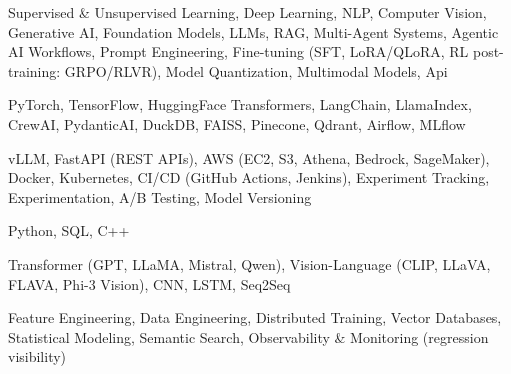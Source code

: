 \documentclass[letter,10pt]{article}
\begin{document}
 Supervised \& Unsupervised Learning, Deep Learning, NLP, Computer Vision, Generative AI, Foundation Models, LLMs, RAG, Multi-Agent Systems, Agentic AI Workflows, Prompt Engineering, Fine-tuning (SFT, LoRA/QLoRA, RL post-training: GRPO/RLVR), Model Quantization, Multimodal Models, Api\par\vspace{2pt}

 PyTorch, TensorFlow, HuggingFace Transformers, LangChain, LlamaIndex, CrewAI, PydanticAI, DuckDB, FAISS, Pinecone, Qdrant, Airflow, MLflow\par\vspace{2pt}

 vLLM, FastAPI (REST APIs), AWS (EC2, S3, Athena, Bedrock, SageMaker), Docker, Kubernetes, CI/CD (GitHub Actions, Jenkins), Experiment Tracking, Experimentation, A/B Testing, Model Versioning\par\vspace{2pt}

 Python, SQL, C++\par\vspace{2pt}

 Transformer (GPT, LLaMA, Mistral, Qwen), Vision-Language (CLIP, LLaVA, FLAVA, Phi-3 Vision), CNN, LSTM, Seq2Seq\par\vspace{2pt}

 Feature Engineering, Data Engineering, Distributed Training, Vector Databases, Statistical Modeling, Semantic Search, Observability \& Monitoring (regression visibility)
\end{document}
